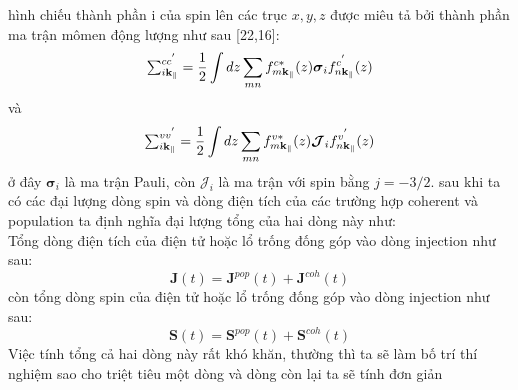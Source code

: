 hình chiếu thành phần i của spin lên các trục $x,y,z$ được miêu tả bởi thành phần ma trận mômen động lượng như sau [22,16]:
\begin{equation}
{\mathsmaller{\sum\nolimits_{i\mathbf{k}_\parallel}^{cc^{'}}}} =
\frac{1}{2}\int dz\sum_{mn}
f_{m\mathbf{k}_{\parallel}}^{c*}(z)
\boldsymbol{\sigma}_i
f_{n\mathbf{k}_{\parallel}}^{c^{'}}(z)
\end{equation}
và 
\begin{equation}
{\mathsmaller{\sum\nolimits_{i\mathbf{k}_\parallel}^{vv^{'}}}} =
\frac{1}{2}\int dz\sum_{mn}
f_{m\mathbf{k}_{\parallel}}^{v*}(z)
\boldsymbol{\mathcal{J}}_i
f_{n\mathbf{k}_{\parallel}}^{v^{'}}(z)
\end{equation}
ở đây $\boldsymbol{\sigma}_i$ là ma trận Pauli, còn $\boldsymbol{\mathcal{J}}_i$ là ma trận với spin bằng $j=-3/2$. sau khi ta có các đại lượng dòng spin và dòng điện tích của các trường hợp coherent và population ta định nghĩa đại lượng tổng của hai dòng này như:\\
Tổng dòng điện tích của điện tử hoặc lổ trống đống góp vào dòng injection như sau:
\begin{equation}
\mathbf{J}(t) =\mathbf{J}^{pop}(t) +\mathbf{J}^{coh}(t)
\end{equation}
còn tổng dòng spin của điện tử hoặc lổ trống đống góp vào dòng injection như sau:
\begin{equation}
\mathbf{S}(t) = \mathbf{S}^{pop}(t) + \mathbf{S}^{coh}(t)
\end{equation}
Việc tính tổng cả hai dòng này rất khó khăn, thường thì ta sẽ làm bố trí thí nghiệm sao cho triệt tiêu một dòng và dòng còn lại ta sẽ tính đơn giản 